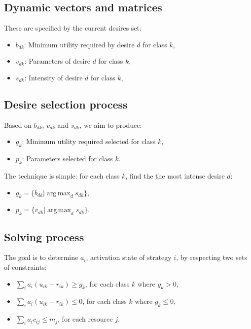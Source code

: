 \documentclass[12pt]{article}
\DeclareMathOperator*{\argmax}{arg\,max}
\begin{document}
\subsection*{Dynamic vectors and matrices} 

These are specified by the current desires set:

\begin{itemize}
	\item $b_{dk}$: Minimum utility required by desire $d$ for class $k$,
	\item $v_{dk}$: Parameters of desire $d$ for class $k$,
	\item $s_{dk}$: Intensity of desire $d$ for class $k$,
\end{itemize}

\subsection*{Desire selection process}

Based on $b_{dk}$, $v_{dk}$ and $s_{dk}$, we aim to produce:

\begin{itemize}
	\item $g_{k}$: Minimum utility required selected for class $k$,
	\item $p_{k}$: Parameters selected for class $k$.
\end{itemize}

The technique is simple: for each class $k$, find the the most intense desire $d$:

\begin{itemize}
	\item $g_{k} = \{ b_{dk} | \argmax_d s_{dk} \} $,
	\item $p_{k} = \{ v_{dk} | \argmax_d s_{dk} \} $. 
\end{itemize}

\subsection*{Solving process}
The goal is to determine $a_{i}$, activation state of strategy $i$, by respecting two sets of constraints:

\begin{itemize}
	\item $\sum\limits_i a_i (u_{ik} - r_{ik}) \geq g_k$, for each class $k$
        where $g_k > 0$, 
	\item $\sum\limits_i a_i (u_{ik} - r_{ik}) \leq 0$, for each class $k$
        where $g_k \leq 0$, 
	\item $\sum\limits_i a_i c_{ij} \leq m_j$, for each resource $j$.
\end{itemize}
\end{document}
